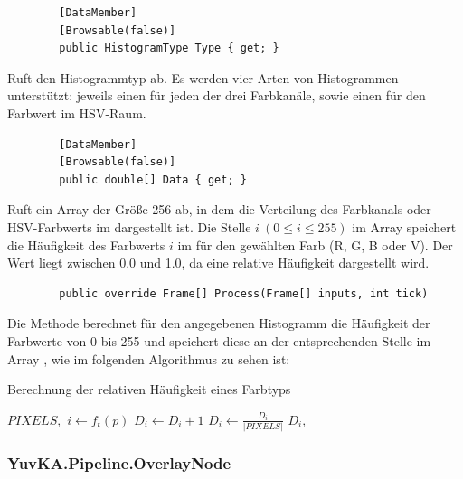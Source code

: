 \begin{itemize}
	\begin{verbatim}
		[DataMember]
		[Browsable(false)]
		public HistogramType Type { get; }
	\end{verbatim}
	Ruft den Histogrammtyp ab. Es werden vier Arten von Histogrammen unterstützt: jeweils einen für jeden der drei Farbkanäle, sowie einen für den Farbwert im HSV-Raum.
	
	\begin{verbatim}
		[DataMember]
		[Browsable(false)]
		public double[] Data { get; }
	\end{verbatim}
	Ruft ein Array der Größe 256 ab, in dem die Verteilung des Farbkanals oder HSV-Farbwerts im  dargestellt ist. Die Stelle $ i \ (0 \leq i \leq 255) $ im Array speichert die Häufigkeit des Farbwerts $ i $ im  für den gewählten Farb (R, G, B oder V). Der Wert liegt zwischen 0.0 und 1.0, da eine relative Häufigkeit dargestellt wird.

	\begin{verbatim}
		public override Frame[] Process(Frame[] inputs, int tick)
	\end{verbatim}
	Die Methode  berechnet für den angegebenen Histogramm die Häufigkeit der Farbwerte von 0 bis 255 und speichert diese an der entsprechenden Stelle im Array , wie im folgenden Algorithmus zu sehen ist:
	\begin{algorithm}[H]
		\caption{Berechnung der relativen Häufigkeit eines Farbtyps}
		\begin{algorithmic}[1]
			\REQUIRE $ PIXELS, $ 
			\STATE {}
				\STATE $ i \gets f_{t}(p) $
				\STATE $ D_i \gets D_i + 1 $
			\ENDFOR
				\STATE $ D_i \gets \frac{D_i}{|PIXELS|} $
			\ENDFOR
			\ENSURE $ D_i, $ 
		\end{algorithmic}
	\end{algorithm}

\end{itemize}

\subsubsection{YuvKA.Pipeline.OverlayNode}

